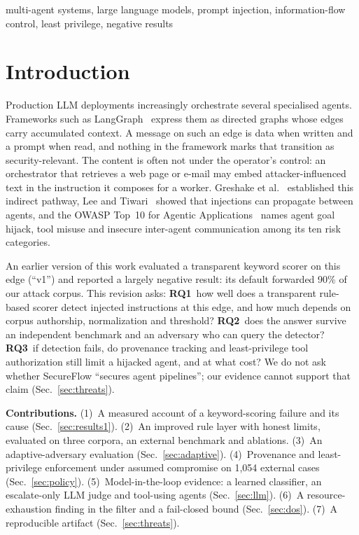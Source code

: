 \documentclass[conference]{IEEEtran}
\newcommand{\Ourfirst}{An earlier version of this work}
\newcommand{\Ourfirst}{Our first manuscript}
\begin{document}
\begin{IEEEkeywords}
multi-agent systems, large language models, prompt injection, information-flow
control, least privilege, negative results
\end{IEEEkeywords}

\section{Introduction}

Production LLM deployments increasingly orchestrate several specialised agents.
Frameworks such as LangGraph~\cite{langgraph} express them as directed graphs whose
edges carry accumulated context. A message on such an edge is data when written and a
prompt when read, and nothing in the framework marks that transition as
security-relevant. The content is often not under the operator's control: an
orchestrator that retrieves a web page or e-mail may embed attacker-influenced text in
the instruction it composes for a worker. Greshake et al.~\cite{greshake2023indirect}
established this indirect pathway, Lee and Tiwari~\cite{lee2024infection} showed that
injections can propagate between agents, and the OWASP Top~10 for Agentic
Applications~\cite{owaspagentic2026} names agent goal hijack, tool misuse and insecure
inter-agent communication among its ten risk categories.

\Ourfirst{} evaluated a transparent keyword scorer on this edge (``v1'') and
reported a largely negative result: its default forwarded 90\% of our attack corpus.
This revision asks: \textbf{RQ1}~how well does a transparent rule-based scorer detect
injected instructions at this edge, and how much depends on corpus authorship,
normalization and threshold? \textbf{RQ2}~does the answer survive an independent
benchmark and an adversary who can query the detector? \textbf{RQ3}~if detection
fails, do provenance tracking and least-privilege tool authorization still limit a
hijacked agent, and at what cost? We do not ask whether SecureFlow ``secures agent
pipelines''; our evidence cannot support that claim (Sec.~\ref{sec:threats}).

\textbf{Contributions.} (1)~A measured account of a keyword-scoring failure and its
cause (Sec.~\ref{sec:results1}). (2)~An improved rule layer with honest limits,
evaluated on three corpora, an external benchmark and ablations. (3)~An
adaptive-adversary evaluation (Sec.~\ref{sec:adaptive}). (4)~Provenance and
least-privilege enforcement under assumed compromise on 1{,}054 external cases
(Sec.~\ref{sec:policy}). (5)~Model-in-the-loop evidence: a learned classifier, an
escalate-only LLM judge and tool-using agents (Sec.~\ref{sec:llm}). (6)~A
resource-exhaustion finding in the filter and a fail-closed bound
(Sec.~\ref{sec:dos}). (7)~A reproducible artifact (Sec.~\ref{sec:threats}).
\end{document}
